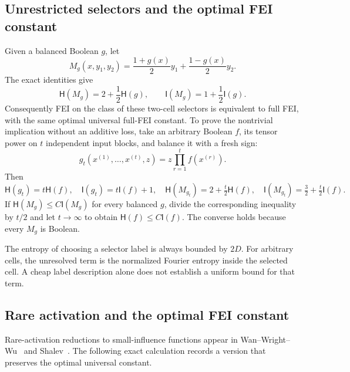 \documentclass[11pt]{amsart}
\theoremstyle{definition}
\theoremstyle{remark}
\newcommand{\HH}{\mathsf H}
\newcommand{\I}{\mathsf I}
\begin{document}
\subsection{Unrestricted selectors and the optimal FEI constant}

Given a balanced Boolean $g$, let
\[
 M_g(x,y_1,y_2)=\frac{1+g(x)}2y_1+\frac{1-g(x)}2y_2.
\]
The exact identities give
\[
 \HH(M_g)=2+\frac12\HH(g),\qquad \I(M_g)=1+\frac12\I(g).
\]
Consequently FEI on the class of these two-cell selectors is equivalent
to full FEI, with the same optimal universal full-FEI constant.
To prove the nontrivial implication without an additive loss, take an
arbitrary Boolean $f$, its tensor power on $t$ independent input blocks,
and balance it with a fresh sign:
\[
 g_t(x^{(1)},\ldots,x^{(t)},z)
   =z\prod_{r=1}^t f(x^{(r)}).
\]
Then
\[
 \HH(g_t)=t\HH(f),\quad \I(g_t)=t\I(f)+1,
\quad \HH(M_{g_t})=2+\tfrac t2\HH(f),\quad
 \I(M_{g_t})=\tfrac32+\tfrac t2\I(f).
\]
If $\HH(M_g)\le C \I(M_g)$ for every balanced $g$, divide the corresponding
inequality by $t/2$ and let $t\to\infty$ to obtain $\HH(f)\le C \I(f)$.
The converse holds because every $M_g$ is Boolean.

The entropy of choosing a selector label is always bounded by $2D$.
For arbitrary cells, the unresolved term is the normalized Fourier
entropy inside the selected cell. A cheap label description alone does
not establish a uniform bound for that term.

\subsection{Rare activation and the optimal FEI constant}\label{sec:rare-equivalence}

Rare-activation reductions to small-influence functions appear in
Wan--Wright--Wu~\cite{WWW14} and Shalev~\cite{Shalev18}.
The following exact calculation records a version that preserves the
optimal universal constant.
\end{document}
